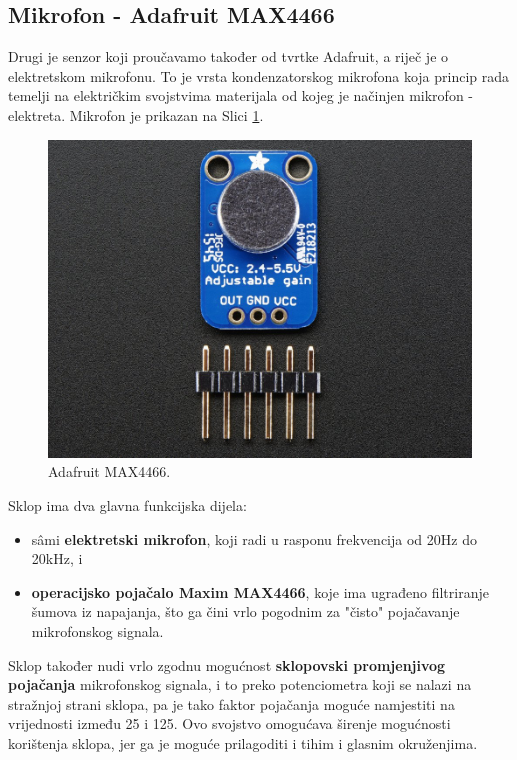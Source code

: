 \documentclass[12pt,a4paper]{article}
\begin{document}
	\newpage
	\subsection{Mikrofon - Adafruit MAX4466}
		Drugi je senzor koji proučavamo također od tvrtke Adafruit, a riječ je o elektretskom mikrofonu. To je vrsta kondenzatorskog mikrofona koja princip rada temelji na električkim svojstvima materijala od kojeg je načinjen mikrofon - elektreta. Mikrofon je prikazan na Slici \ref{fig:max4466}.

		\begin{figure}[h!]
			\includegraphics[width=\linewidth]{slike/4466.jpg}
			\caption{Adafruit MAX4466.}
			\label{fig:max4466}
		\end{figure}

		\par Sklop ima dva glavna funkcijska dijela:
		\begin{itemize}
			\item sâmi \textbf{elektretski mikrofon}, koji radi u rasponu frekvencija od 20Hz do 20kHz, i
			\item \textbf{operacijsko pojačalo Maxim MAX4466}, koje ima ugrađeno filtriranje šumova iz napajanja, što ga čini vrlo pogodnim za "čisto" pojačavanje mikrofonskog signala.
		\end{itemize}

		Sklop također nudi vrlo zgodnu mogućnost \textbf{sklopovski promjenjivog pojačanja} mikrofonskog signala, i to preko potenciometra koji se nalazi na stražnjoj strani sklopa, pa je tako faktor pojačanja moguće namjestiti na vrijednosti između 25 i 125. Ovo svojstvo omogućava širenje mogućnosti korištenja sklopa, jer ga je moguće prilagoditi i tihim i glasnim okruženjima.
\end{document}
